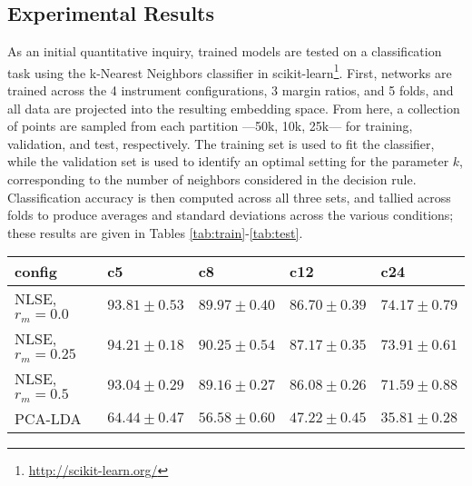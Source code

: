 \subsection{Experimental Results}

As an initial quantitative inquiry, trained models are tested on a classification task using the k-Nearest Neighbors classifier in scikit-learn\footnote{\url{http://scikit-learn.org/}}.
First, networks are trained across the 4 instrument configurations, 3 margin ratios, and 5 folds, and all data are projected into the resulting embedding space.
From here, a collection of points are sampled from each partition ---50k, 10k, 25k--- for training, validation, and test, respectively.
The training set is used to fit the classifier, while the validation set is used to identify an optimal setting for the parameter $k$, corresponding to the number of neighbors considered in the decision rule.
Classification accuracy is then computed across all three sets, and tallied across folds to produce averages and standard deviations across the various conditions; these results are given in Tables \ref{tab:train}-\ref{tab:test}.


\begin{table*}[h!]
\begin{center}
\caption{kNN classification results over the training set.}
\small
\begin{tabular}{lllll}
 config  & c5    & c8   & c12  & c24  \\
\hline
 NLSE, $r_{m}=0.0$ & $93.81\pm0.53$ & $89.97\pm0.40$ & $86.70\pm0.39$ & $74.17\pm0.79$ \\
 NLSE, $r_{m}=0.25$ & $94.21\pm0.18$ & $90.25\pm0.54$ & $87.17\pm0.35$ & $73.91\pm0.61$ \\
 NLSE, $r_{m}=0.5$  & $93.04\pm0.29$ & $89.16\pm0.27$ & $86.08\pm0.26$ & $71.59\pm0.88$ \\
 \hline
 PCA-LDA & $64.44\pm0.47$ & $56.58\pm0.60$ & $47.22\pm0.45$ & $35.81\pm0.28$ \\

\hline
\end{tabular}
\label{tab:train}
\end{center}
\end{table*}

